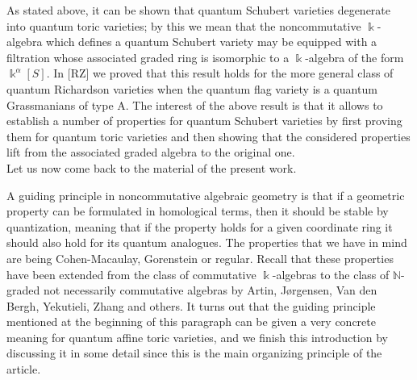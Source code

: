 \documentclass[twoside,11pt]{article}
\renewcommand{\k}{\Bbbk}
\newcommand{\N}{{\mathbb N}}
\begin{document}
As stated above, it can be shown that quantum Schubert varieties degenerate into
quantum toric varieties; by this we mean that the noncommutative $\k$-algebra which
defines a quantum Schubert variety may be equipped with a filtration whose
associated graded ring is isomorphic to a $\k$-algebra of the form $\k^\alpha[S]$. In [RZ]
we proved that this result holds for the more general class of quantum Richardson
varieties when the quantum flag variety is a quantum Grassmanians of type A.
The interest of the above result is that it allows to establish a number of properties for
quantum Schubert varieties by first proving them for quantum toric varieties and then
showing that the considered properties lift from the associated graded algebra to the
original one. \\

Let us now come back to the material of the present work.

A guiding principle in noncommutative algebraic geometry is that if a geometric property
can be formulated in homological terms, then it should be stable by quantization, meaning
that if the property holds for a given coordinate ring it should also hold for
its quantum analogues. The properties that we have in mind are being Cohen-Macaulay,
Gorenstein or regular. Recall that these properties have been extended from the class of
commutative $\k$-algebras to the class of $\N$-graded not necessarily commutative algebras
by Artin, J\o rgensen, Van den Bergh, Yekutieli, Zhang and others. It turns out that the
guiding principle mentioned at the beginning of this paragraph can be given a very
concrete meaning for quantum affine toric varieties, and we finish this
introduction by discussing it in some detail since this is the main organizing principle
of the article.
\end{document}

